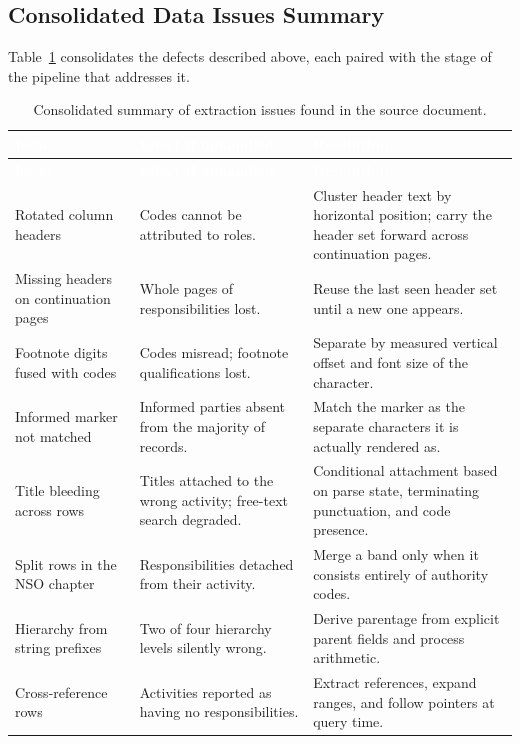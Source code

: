 \subsection{Consolidated Data Issues Summary}

Table~\ref{tab:issues} consolidates the defects described above, each paired with the stage of the pipeline that addresses it.

\begin{longtable}{|p{}|p{}|p{}|}
\caption{Consolidated summary of extraction issues found in the source document.}\label{tab:issues}\\
\hline
\rowcolor{myblue}\textcolor{white}{\textbf{Issue}} & \textcolor{white}{\textbf{Effect if unhandled}} & \textcolor{white}{\textbf{Resolution}} \\
\hline
\endfirsthead
\hline
\rowcolor{myblue}\textcolor{white}{\textbf{Issue}} & \textcolor{white}{\textbf{Effect if unhandled}} & \textcolor{white}{\textbf{Resolution}} \\
\hline
\endhead
Rotated column headers & Codes cannot be attributed to roles. & Cluster header text by horizontal position; carry the header set forward across continuation pages. \\ \hline
Missing headers on continuation pages & Whole pages of responsibilities lost. & Reuse the last seen header set until a new one appears. \\ \hline
Footnote digits fused with codes & Codes misread; footnote qualifications lost. & Separate by measured vertical offset and font size of the character. \\ \hline
Informed marker not matched & Informed parties absent from the majority of records. & Match the marker as the separate characters it is actually rendered as. \\ \hline
Title bleeding across rows & Titles attached to the wrong activity; free-text search degraded. & Conditional attachment based on parse state, terminating punctuation, and code presence. \\ \hline
Split rows in the NSO chapter & Responsibilities detached from their activity. & Merge a band only when it consists entirely of authority codes. \\ \hline
Hierarchy from string prefixes & Two of four hierarchy levels silently wrong. & Derive parentage from explicit parent fields and process arithmetic. \\ \hline
Cross-reference rows & Activities reported as having no responsibilities. & Extract references, expand ranges, and follow pointers at query time. \\ \hline
\end{longtable}

